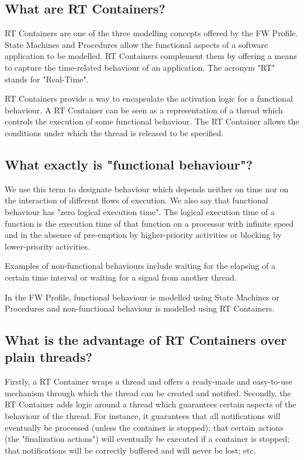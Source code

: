 \documentclass[a4paper,10pt]{article}
\begin{document}
\subsection{What are RT Containers?}
RT Containers are one of the three modelling concepts offered by the FW Profile. State Machines and Procedures allow the functional aspects of a software application to be
modelled. RT Containers complement them by offering a means to capture the
time-related behaviour of an application. The acronym "RT" stands for "Real-Time".

RT Containers provide a way to encapsulate the activation logic for a functional behaviour. A RT Container can be seen as a representation of a thread which controls the execution of some functional behaviour. The RT Container allows the conditions under which the thread is released to be specified.

\subsection{What exactly is "functional behaviour"?}
We use this term to designate behaviour which depends neither on time nor on the interaction of different flows of execution. We also say that functional behaviour has "zero logical execution time". The logical execution time of a function is the execution time of that function on a processor with infinite speed and in the absence of pre-emption by higher-priority activities or blocking by lower-priority activities. 

Examples of non-functional behaviours include waiting for the elapsing of a certain time interval or waiting for a signal from another thread.

In the FW Profile, functional behaviour is modelled using State Machines or Procedures and non-functional behaviour is modelled using RT Containers.

\subsection{What is the advantage of RT Containers over plain threads?}
Firstly, a RT Container wraps a thread and offers a ready-made and easy-to-use mechanism through which the thread can be created and notified. Secondly, the RT Container adds logic around a thread which guarantees certain aspects of the behaviour of the thread. For instance, it guarantees that all notifications will eventually be processed (unless the container is stopped); that certain actions (the "finalization actions") will eventually be executed if a container is stopped; that notifications will be correctly buffered and will never be lost; etc.
\end{document}
